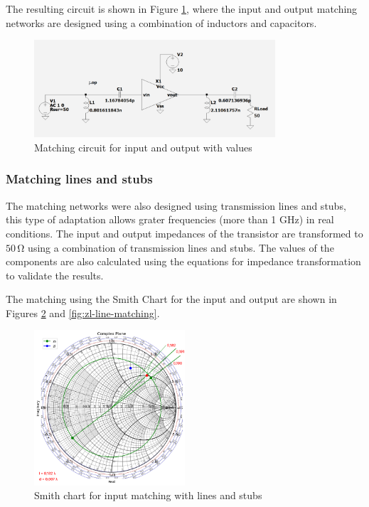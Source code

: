The resulting circuit is shown in Figure \ref{fig:MatchingCircuit}, where the input and output matching networks are designed using a combination of inductors and capacitors.

\begin{figure}[H]
    \centering
    \includegraphics[width=0.8\textwidth]{Images/LC_matching-circuit.png}
    \caption{Matching circuit for input and output with values}
    \label{fig:MatchingCircuit}
\end{figure}

\subsubsection{Matching lines and stubs}
The matching networks were also designed using transmission lines and stubs, this type of adaptation allows grater frequencies (more than 1 \si{\giga \hertz}) in real conditions. The input and output impedances of the transistor are transformed to $50\,\si{\ohm}$ using a combination of transmission lines and stubs. The values of the components are also calculated using the equations for impedance transformation to validate the results.

The matching using the Smith Chart for the input and output are shown in Figures \ref{fig:zs-line-matching} and \ref{fig:zl-line-matching}.

\begin{figure}[H]
    \centering
    \includegraphics[width=0.5\textwidth]{Images/zs-LS-matching.png}
    \caption{Smith chart for input matching with lines and stubs}
    \label{fig:zs-line-matching}
\end{figure}

